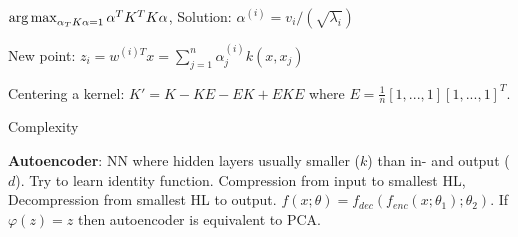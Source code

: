 $ \operatorname*{arg\,max}_{\alpha_T K \alpha = 1} \alpha^T K^T K \alpha$, Solution: $\alpha^{(i)} = v_i/(\sqrt{\lambda_i})$

New point: $z_i = w^{(i)T}x = \sum_{j=1}^n \alpha_j^{(i)} k(x, x_j)$

Centering a kernel: $K' = K - KE - EK + EKE$ where $E = \frac{1}{n}[1,...,1][1,...,1]^T$.

Complexity 

\textbf{Autoencoder}: NN where hidden layers usually smaller ($k$) than in- and output ($d$). Try to learn identity function. Compression from input to smallest HL, Decompression from smallest HL to output. $f(x; \theta) = f_{dec}(f_{enc}(x; \theta_1);\theta_2)$. If $\varphi(z) = z$ then autoencoder is equivalent to PCA.
